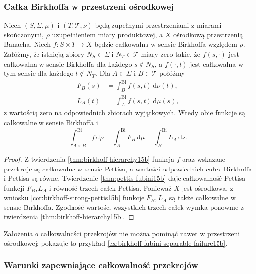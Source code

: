 \subsubsection{Całka Birkhoffa w przestrzeni ośrodkowej}

\begin{wniosek}
\label{cor:birkhoff-fubini-separable15b}
Niech $(S,\Sigma,\mu)$ i $(T,\mathcal T,\nu)$ będą
zupełnymi przestrzeniami z miarami skończonymi,
$\rho$ uzupełnieniem miary produktowej, a $X$
ośrodkową przestrzenią Banacha.
Niech $f:S\times T\to X$ będzie całkowalna
w sensie Birkhoffa względem $\rho$.
Załóżmy, że istnieją zbiory $N_S\in\Sigma$
i $N_T\in\mathcal T$ miary zero takie, że
$f(s,\cdot)$ jest całkowalna w sensie Birkhoffa
dla każdego $s\notin N_S$, a $f(\cdot,t)$ jest
całkowalna w tym sensie dla każdego $t\notin N_T$.
Dla $A\in\Sigma$ i $B\in\mathcal T$ połóżmy
\[
 \begin{aligned}
 F_B(s)&=\int_B^{\mathrm{Bi}} f(s,t)\,\mathrm d\nu(t),\\
 L_A(t)&=\int_A^{\mathrm{Bi}} f(s,t)\,\mathrm d\mu(s),
 \end{aligned}
\]
z wartością zero na odpowiednich zbiorach wyjątkowych.
Wtedy obie funkcje są całkowalne w sensie Birkhoffa i
\[
 \int_{A\times B}^{\mathrm{Bi}} f\,\mathrm d\rho
 =\int_A^{\mathrm{Bi}} F_B\,\mathrm d\mu
 =\int_B^{\mathrm{Bi}} L_A\,\mathrm d\nu.
\]
\end{wniosek}
\begin{proof}
Z twierdzenia \ref{thm:birkhoff-hierarchy15b}
funkcja $f$ oraz wskazane przekroje są całkowalne
w sensie Pettisa, a wartości odpowiednich całek
Birkhoffa i Pettisa są równe. Twierdzenie
\ref{thm:pettis-fubini15b} daje całkowalność Pettisa
funkcji $F_B,L_A$ i równość trzech całek Pettisa.
Ponieważ $X$ jest ośrodkowa, z wniosku
\ref{cor:birkhoff-strong-pettis15b} funkcje $F_B,L_A$
są także całkowalne w sensie Birkhoffa.
Zgodność wartości wszystkich trzech całek wynika
ponownie z twierdzenia \ref{thm:birkhoff-hierarchy15b}.
\end{proof}

Założenia o całkowalności przekrojów nie można
pominąć nawet w przestrzeni ośrodkowej; pokazuje to
przykład \ref{ex:birkhoff-fubini-separable-failure15b}.

\subsubsection{Warunki zapewniające całkowalność przekrojów}

